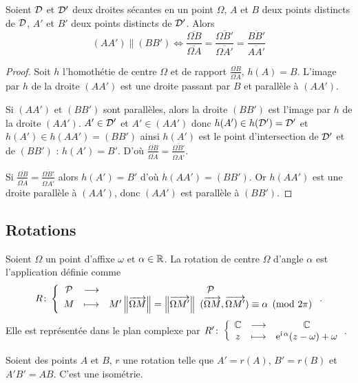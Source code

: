 \begin{theo}
  Soient $\mathcal{D}$ et $\mathcal{D}'$ deux droites sécantes en un point $\Omega$, $A$ et $B$ deux points distincts de $\mathcal{D}$, $A'$ et $B'$ deux points distincts de $\mathcal{D}'$. Alors
  \begin{equation}
    (AA') \parallel (BB') \iff \frac{\overline{\Omega B}}{\overline{\Omega A}}=\frac{\overline{\Omega B'}}{\overline{\Omega A'}}=\frac{\overline{BB'}}{\overline{AA'}}
  \end{equation}
\end{theo}
\begin{proof}
  Soit $h$ l'homothétie de centre $\Omega$ et de rapport $\frac{\overline{\Omega B}}{\overline{\Omega A}}$, $h(A)=B$. L'image par $h$ de la droite $(AA')$ est une droite passant par $B$ et parallèle à $(AA')$.

Si $(AA')$ et $(BB')$ sont parallèles, alors la droite $(BB')$ est l'image par $h$ de la droite $(AA')$. $A' \in \mathcal{D}'$ et $A' \in (AA')$ donc $h(A') \in h(\mathcal{D}')=\mathcal{D}'$ et $h(A') \in h(AA') = (BB')$ ainsi $h(A')$ est le point d'intersection de $\mathcal{D}'$ et de $(BB')$ : $h(A')=B'$. D'où $\frac{\overline{\Omega B}}{\overline{\Omega A}}=\frac{\overline{\Omega B'}}{\overline{\Omega A'}}$.

Si $\frac{\overline{\Omega B}}{\overline{\Omega A}}=\frac{\overline{\Omega B'}}{\overline{\Omega A'}}$ alors $h(A')=B'$ d'où $h(AA')=(BB')$. Or $h(AA')$ est une droite parallèle à $(AA')$, donc $(AA')$ est parallèle à $(BB')$.
\end{proof}

\subsection{Rotations}

\begin{defdef}
  Soient $\Omega$ un point d'affixe $\omega$ et $\alpha \in \mathbb{R}$. La rotation de centre $\Omega$ d'angle $\alpha$ est l'application définie comme 
\begin{equation}
R\colon \left\{\begin{array}{ccc} \mathcal{P} & \longrightarrow &\mathcal{P}\\ M & \longmapsto & M' \left\lVert\overrightarrow{\Omega M}\right\rVert= \left\lVert\overrightarrow{\Omega M'}\right\rVert \ (\overrightarrow{\Omega M},\overrightarrow{\Omega M'}) \equiv \alpha \pmod {2\pi} \end{array} \right..
\end{equation}
 Elle est représentée dans le plan complexe par $R'\colon \left\{\begin{array}{ccc} \mathbb{C} & \longrightarrow &\mathbb{C}\\ z & \longmapsto & \operatorname{e}^{\operatorname{i} \alpha}(z-\omega) + \omega \end{array} \right.$.
\end{defdef}
\begin{prop}
  Soient des points $A$ et $B$, $r$ une rotation telle que $A'=r(A)$, $B'=r(B)$ et $A'B'=AB$. C'est une isométrie.
\end{prop}

